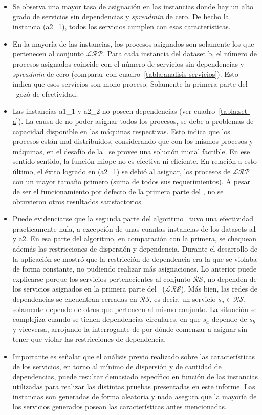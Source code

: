 \documentclass[../informe2.tex]{subfiles}
\begin{document}
\begin{itemize}
	\item Se observa una mayor tasa de asignación en las instancias donde hay un alto grado de servicios sin dependencias y \textit{spreadmin} de cero. De hecho la instancia (a2\_1), todos los servicios cumplen con esas características.
	\item En la mayoría de las instancias, los procesos asignados son solamente los que pertenecen al conjunto $\mathcal{LRP}$. Para cada instancia del dataset b, el número de procesos asignados coincide con el número de servicios sin dependencias y \textit{spreadmin} de cero (comparar con cuadro~\ref{tabla:analisis-servicios}). Esto indica que esos servicios son mono-proceso. Solamente la primera parte del \greedy\ gozó de efectividad.
	\item Las instancias a1\_1 y a2\_2 no poseen dependencias (ver cuadro~\ref{tabla:set-a}). La causa de no poder asignar todos los procesos, se debe a problemas de capacidad disponible en las máquinas respectivas. Esto indica que los procesos están mal distribuidos, considerando que con los mismos procesos y máquinas, en el desafío de la \roadef\ se provee una solución inicial factible. En ese sentido sentido, la función miope no es efectiva ni eficiente. En relación a esto último, el éxito logrado en (a2\_1) se debió al asignar, los procesos de $\mathcal{LRP}$ con un mayor tamaño primero (suma de todos sus requerimientos). A pesar de ser el funcionamiento por defecto de la primera parte del \greedy, no se obtuvieron otros resultados satisfactorios.
	\item Puede evidenciarse que la segunda parte del algoritmo \greedy\ tuvo una efectividad practicamente nula, a excepción de unas cuantas instancias de los datasets a1 y a2. En esa parte del algoritmo, en comparación con la primera, se chequean además las restricciones de dispersión y dependencia. Durante el desarrollo de la aplicación se mostró que la restricción de dependencia era la que se violaba de forma constante, no pudiendo realizar más asignaciones. Lo anterior puede explicarse porque los servicios pertenecientes al conjunto $\mathcal{RS}$, no dependen de los servicios asignados en la primera parte del \greedy\ ($\mathcal{LRS}$). Más bien, las redes de dependencias se encuentran cerradas en $\mathcal{RS}$, es decir, un servicio $s_a \in \mathcal{RS}$, solamente depende de otros que pertencen al mismo conjunto. La situación se complejiza cuando se tienen dependencias circulares, en que $s_a$ depende de $s_b$ y viceversa, arrojando la interrogante de por dónde comenzar a asignar sin tener que violar las restricciones de dependencia.
	\item Importante es señalar que el análisis previo realizado sobre las características de los servicios, en torno al mínimo de dispersión y de cantidad de dependencias, puede resultar demasiado específico en función de las instancias utilizadas para realizar las distintas pruebas presentadas en este informe. Las instancias son generadas de forma aleatoria y nada asegura que la mayoría de los servicios generados posean las características antes mencionadas.
\end{itemize}
\end{document}
